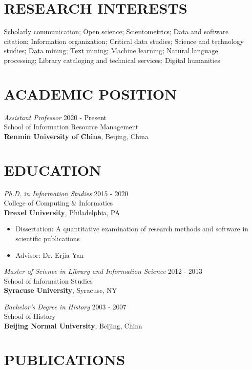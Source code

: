 \documentclass[margin, 10pt]{res} %
\begin{document}
\begin{resume}


\section{RESEARCH INTERESTS}  

Scholarly communication; Open science; Scientometrics; Data and software citation; Information organization; Critical data studies; Science and technology studies; Data mining; Text mining; Machine learning; Natural language processing; Library cataloging and technical services; Digital humanities

\section{ACADEMIC POSITION}
{\sl Assistant Professor} \hfill 2020 - Present \\
School of Information Resource Management\\
\textbf{Renmin University of China}, Beijing, China

\section{EDUCATION}

{\sl Ph.D. in Information Studies} \hfill 2015 - 2020 \\
College of Computing \& Informatics\\
\textbf{Drexel University}, Philadelphia, PA
\begin{itemize}
\item Dissertation: A quantitative examination of research methods and software in scientific publications
\item Advisor: Dr. Erjia Yan
\end{itemize} 

{\sl Master of Science in Library and Information Science} \hfill 2012 - 2013 \\
School of Information Studies\\
\textbf{Syracuse University}, Syracuse, NY
 
{\sl Bachelor’s Degree in History} \hfill 2003 - 2007\\
School of History\\
\textbf{Beijing Normal University}, Beijing, China

\section{PUBLICATIONS}


\end{resume}
\end{document}
